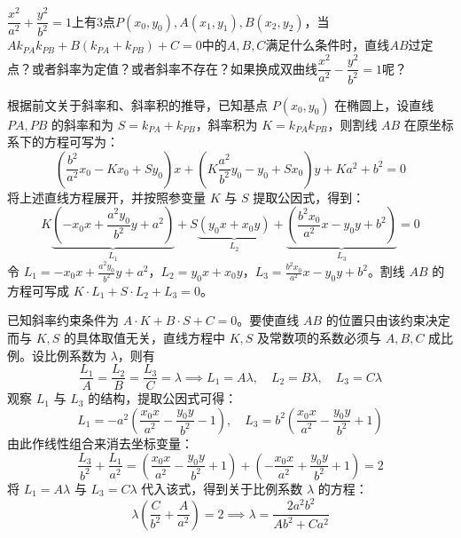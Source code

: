 \begin{exercise}
    $\dfrac{x^2}{a^2} + \dfrac{y^2}{b^2} = 1$上有3点$P(x_0,y_0),A(x_1,y_1),B(x_2,y_2)$，当$A k_{PA}k_{PB}+B(k_{PA}+k_{PB})+C=0$中的$A,B,C$满足什么条件时，直线$AB$过定点？或者斜率为定值？或者斜率不存在？如果换成双曲线$\dfrac{x^2}{a^2} - \dfrac{y^2}{b^2} = 1$呢？
\end{exercise}
\begin{solution}
根据前文关于斜率和、斜率积的推导，已知基点 $P(x_0, y_0)$ 在椭圆上，设直线 $PA, PB$ 的斜率和为 $S = k_{PA} + k_{PB}$，斜率积为 $K = k_{PA}k_{PB}$，则割线 $AB$ 在原坐标系下的方程可写为：
\[ \left( \frac{b^2}{a^2} x_0 - K x_0 + S y_0 \right) x + \left( K \frac{a^2}{b^2} y_0 - y_0 + S x_0 \right) y + K a^2 + b^2 = 0 \]
将上述直线方程展开，并按照参变量 $K$ 与 $S$ 提取公因式，得到：
\[ K \underbrace{\left( -x_0 x + \frac{a^2 y_0}{b^2} y + a^2 \right)}_{L_1} + S \underbrace{\left( y_0 x + x_0 y \right)}_{L_2} + \underbrace{\left( \frac{b^2 x_0}{a^2} x - y_0 y + b^2 \right)}_{L_3} = 0 \]
令 $L_1 = -x_0 x + \frac{a^2 y_0}{b^2} y + a^2$，$L_2 = y_0 x + x_0 y$，$L_3 = \frac{b^2 x_0}{a^2} x - y_0 y + b^2$。割线 $AB$ 的方程可写成 $K \cdot L_1 + S \cdot L_2 + L_3 = 0$。

已知斜率约束条件为 $A \cdot K + B \cdot S + C = 0$。要使直线 $AB$ 的位置只由该约束决定而与 $K,S$ 的具体取值无关，直线方程中 $K,S$ 及常数项的系数必须与 $A,B,C$ 成比例。设比例系数为 $\lambda$，则有
\[ \frac{L_1}{A} = \frac{L_2}{B} = \frac{L_3}{C} = \lambda \implies L_1 = A\lambda, \quad L_2 = B\lambda, \quad L_3 = C\lambda \]
观察 $L_1$ 与 $L_3$ 的结构，提取公因式可得：
\[ L_1 = -a^2 \left( \frac{x_0 x}{a^2} - \frac{y_0 y}{b^2} - 1 \right), \quad L_3 = b^2 \left( \frac{x_0 x}{a^2} - \frac{y_0 y}{b^2} + 1 \right) \]
由此作线性组合来消去坐标变量：
\[ \frac{L_3}{b^2} + \frac{L_1}{a^2} = \left( \frac{x_0 x}{a^2} - \frac{y_0 y}{b^2} + 1 \right) + \left( -\frac{x_0 x}{a^2} + \frac{y_0 y}{b^2} + 1 \right) = 2 \]
将 $L_1 = A\lambda$ 与 $L_3 = C\lambda$ 代入该式，得到关于比例系数 $\lambda$ 的方程：
\[ \lambda \left( \frac{C}{b^2} + \frac{A}{a^2} \right) = 2 \implies \lambda = \frac{2 a^2 b^2}{A b^2 + C a^2} \]


\end{solution}
